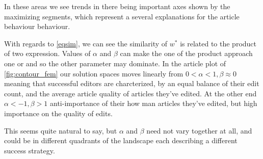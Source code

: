In these areas we see trends in there being important axes shown by the maximizing segments, which represent a several explanations for the article behaviour behaviour.

With regards to \eqref{eqsim}, we can see the similarity of $w^*$ is related to the product of two expression. Values of $\alpha$ and $\beta$ can make the one of the product approach one or and so the other parameter may dominate. In the article plot of \ref{fig:contour_fem} our solution spaces moves linearly from $0 <\alpha <1 , \beta \approx 0$ meaning that successful editors are charcterized, by an equal balance of their edit count, and the average article quality of articles they've edited. At the other end $\alpha < - 1 , \beta > 1$ anti-importance of their how man articles they've edited, but high importance on the quality of edits.

This seems quite natural to say, but $\alpha$ and $\beta$ need not vary together at all, and could be in different quadrants of the landscape each describing a different success strategy.

